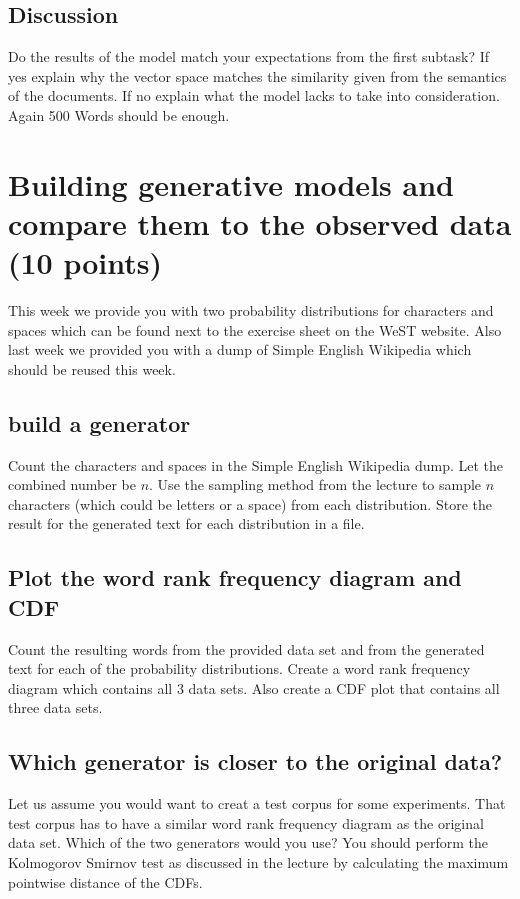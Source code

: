 \documentclass{WeSTassignment}
\begin{document}
\subsection{Discussion}
Do the results of the model match your expectations from the first subtask? If yes explain why the vector space matches the similarity given from the semantics of the documents. If no explain what the model lacks to take into consideration. Again 500 Words should be enough. 




\section{Building generative models and compare them to the observed data (10 points)}
This week we provide you with two probability distributions for characters and spaces which can be found next to the exercise sheet on the WeST website. Also last week we provided you with a dump of Simple English Wikipedia which should be reused this week.

\subsection{build a generator}
Count the characters and spaces in the Simple English Wikipedia dump. Let the combined number be $n$. 
Use the sampling method from the lecture to sample $n$ characters (which could be letters or a space) from each distribution.
Store the result for the generated text for each distribution in a file.

\subsection{Plot the word rank frequency diagram and CDF}
Count the resulting words from the provided data set and from the generated text for each of the probability distributions. 
Create a word rank frequency diagram which contains all 3 data sets. 
Also create a CDF plot that contains all three data sets. 

\subsection{Which generator is closer to the original data?}
Let us assume you would want to creat a test corpus for some experiments. That test corpus has to have a similar word rank frequency diagram as the original data set. Which of the two generators would you use? You should perform the Kolmogorov Smirnov test as discussed in the lecture by calculating the maximum pointwise distance of the CDFs. 
\end{document}
